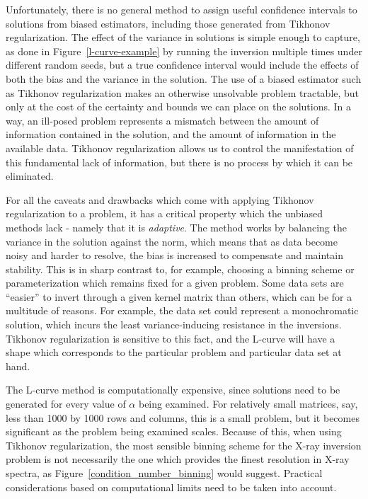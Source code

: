 Unfortunately, there is no general method to assign useful confidence intervals to solutions from biased estimators, including those generated from Tikhonov regularization. The effect of the variance in solutions is simple enough to capture, as done in Figure~\ref{l-curve-example} by running the inversion multiple times under different random seeds, but a true confidence interval would include the effects of both the bias and the variance in the solution. The use of a biased estimator such as Tikhonov regularization  makes an otherwise unsolvable problem tractable, but only at the cost of the certainty and bounds we can place on the solutions. In a way, an ill-posed problem represents a mismatch between the amount of information contained in the solution, and the amount of information in the available data. Tikhonov regularization allows us to control the manifestation of this fundamental lack of information, but there is no process by which it can be eliminated. 

For all the caveats and drawbacks which come with applying Tikhonov regularization to a problem, it has a critical property which the unbiased methods lack - namely that it is \textit{adaptive}. The method works by balancing the variance in the solution against the norm, which means that as data become noisy and harder to resolve, the bias is increased to compensate and maintain stability. This is in sharp contrast to, for example, choosing a binning scheme or parameterization which remains fixed for a given problem. Some data sets are ``easier'' to invert through a given kernel matrix than others, which can be for a multitude of reasons. For example, the data set could represent a monochromatic solution, which incurs the least variance-inducing resistance in the inversions. Tikhonov regularization is sensitive to this fact, and the L-curve will have a shape which corresponds to the particular problem and particular data set at hand. 

The L-curve method is computationally expensive, since solutions need to be generated for every value of $\alpha$ being examined. For relatively small matrices, say, less than 1000 by 1000 rows and columns, this is a small problem, but it becomes significant as the problem being examined scales. Because of this, when using Tikhonov regularization, the most sensible binning scheme for the X-ray inversion problem is not necessarily the one which provides the finest resolution in X-ray spectra, as Figure~\ref{condition_number_binning} would suggest. Practical considerations based on computational limits need to be taken into account. 

